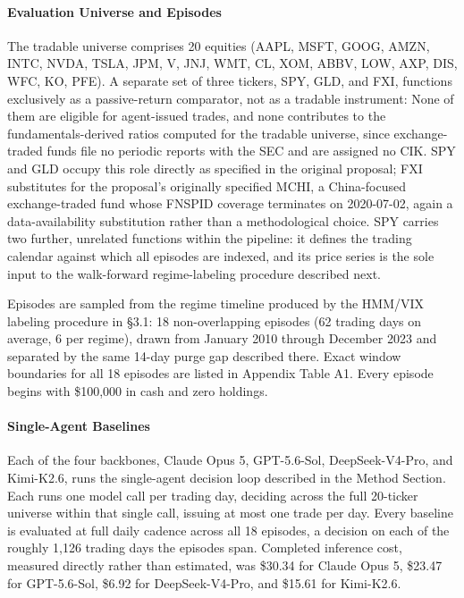 \documentclass{article}
\begin{document}
\paragraph{Evaluation Universe and Episodes} The tradable universe comprises 20 equities (AAPL, MSFT, GOOG, AMZN, INTC, NVDA, TSLA, JPM, V, JNJ, WMT, CL, XOM, ABBV, LOW, AXP, DIS, WFC, KO, PFE). A separate set of three tickers, SPY, GLD, and FXI, functions exclusively as a passive-return comparator, not as a tradable instrument: None of them are eligible for agent-issued trades, and none contributes to the fundamentals-derived ratios computed for the tradable universe, since exchange-traded funds file no periodic reports with the SEC and are assigned no CIK. SPY and GLD occupy this role directly as specified in the original proposal; FXI substitutes for the proposal's originally specified MCHI, a China-focused exchange-traded fund whose FNSPID coverage terminates on 2020-07-02, again a data-availability substitution rather than a methodological choice. SPY carries two further, unrelated functions within the pipeline: it defines the trading calendar against which all episodes are indexed, and its price series is the sole input to the walk-forward regime-labeling procedure described next.

Episodes are sampled from the regime timeline produced by the HMM/VIX labeling procedure in \S3.1: 18 non-overlapping episodes (62 trading days on average, 6 per regime), drawn from January 2010 through December 2023 and separated by the same 14-day purge gap described there. Exact window boundaries for all 18 episodes are listed in Appendix Table A1. Every episode begins with \$100,000 in cash and zero holdings.

\paragraph{Single-Agent Baselines} Each of the four backbones, Claude Opus 5, GPT-5.6-Sol, DeepSeek-V4-Pro, and Kimi-K2.6, runs the single-agent decision loop described in the Method Section. Each runs one model call per trading day, deciding across the full 20-ticker universe within that single call, issuing at most one trade per day. Every baseline is evaluated at full daily cadence across all 18 episodes, a decision on each of the roughly 1,126 trading days the episodes span. Completed inference cost, measured directly rather than estimated, was \$30.34 for Claude Opus 5, \$23.47 for GPT-5.6-Sol, \$6.92 for DeepSeek-V4-Pro, and \$15.61 for Kimi-K2.6.
\end{document}
